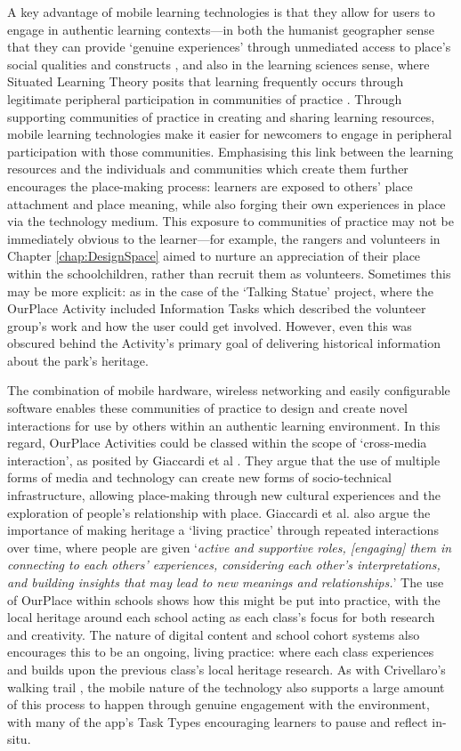 A key advantage of mobile learning technologies is that they allow for users to engage in authentic learning contexts---in both the humanist geographer sense that they can provide `genuine experiences' through unmediated access to place's social qualities and constructs \citep{Relph1976}, and also in the learning sciences sense, where Situated Learning Theory posits that learning frequently occurs through legitimate peripheral participation in communities of practice \citep{lave1991situated}. Through supporting communities of practice in creating and sharing learning resources, mobile learning technologies make it easier for newcomers to engage in peripheral participation with those communities. Emphasising this link between the learning resources and the individuals and communities which create them further encourages the place-making process: learners are exposed to others' place attachment and place meaning, while also forging their own experiences in place via the technology medium. This exposure to communities of practice may not be immediately obvious to the learner---for example, the rangers and volunteers in Chapter \ref{chap:DesignSpace} aimed to nurture an appreciation of their place within the schoolchildren, rather than recruit them as volunteers. Sometimes this may be more explicit: as in the case of the `Talking Statue' project, where the OurPlace Activity included Information Tasks which described the volunteer group's work and how the user could get involved. However, even this was obscured behind the Activity's primary goal of delivering historical information about the park's heritage.

The combination of mobile hardware, wireless networking and easily configurable software enables these communities of practice to design and create novel interactions for use by others within an authentic learning environment. In this regard, OurPlace Activities could be classed within the scope of `cross-media interaction', as posited by Giaccardi et al \citep{Giaccardi2008}. They argue that the use of multiple forms of media and technology can create new forms of socio-technical infrastructure, allowing place-making through new cultural experiences and the exploration of people's relationship with place. Giaccardi et al. also argue the importance of making heritage a `living practice' through repeated interactions over time, where people are given `\textit{active and supportive roles, [engaging] them in connecting to each others’ experiences, considering each other’s interpretations, and building insights that may lead to new meanings and relationships.}' The use of OurPlace within schools shows how this might be put into practice, with the local heritage around each school acting as each class's focus for both research and creativity. The nature of digital content and school cohort systems also encourages this to be an ongoing, living practice: where each class experiences and builds upon the previous class's local heritage research. As with Crivellaro's walking trail \citep{Crivellaro2016}, the mobile nature of the technology also supports a large amount of this process to happen through genuine engagement with the environment, with many of the app's Task Types encouraging learners to pause and reflect in-situ.

